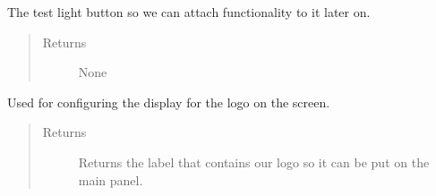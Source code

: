 \documentclass[letterpaper,10pt,english]{sphinxmanual}
\begin{document}
\begin{fulllineitems}
\begin{fulllineitems}
\begin{quote}
\begin{description}
\end{description}\end{quote}

\end{fulllineitems}


\begin{fulllineitems}
\label{\detokenize{index:src.Views.View_VerifySetupScreen.VerifySetupWindow.set_BtnTestLight}}
The test light button so we can attach functionality to it later on.
\begin{quote}\begin{description}
\item[{Returns}] \leavevmode
None

\end{description}\end{quote}

\end{fulllineitems}


\begin{fulllineitems}
\label{\detokenize{index:src.Views.View_VerifySetupScreen.VerifySetupWindow.setupPicture}}
Used for configuring the display for the logo on the screen.
\begin{quote}\begin{description}
\item[{Returns}] \leavevmode
Returns the label that contains our logo so it can be put on the main panel.

\end{description}\end{quote}

\end{fulllineitems}



\end{fulllineitems}
\end{document}
